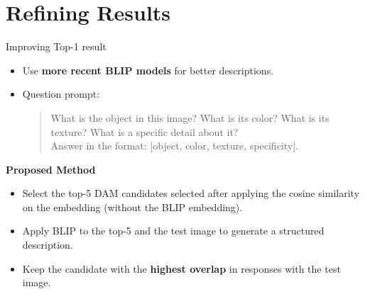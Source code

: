 \documentclass{beamer}
\begin{document}
\section{Refining Results}
\begin{frame}{Improving Top-1 result}
    \begin{itemize}
        \item Use \textbf{more recent BLIP models} for better descriptions.
        \item Question prompt:
            \begin{quote}
                What is the object in this image? What is its color? What is its texture? What is a specific detail about it? \\
                Answer in the format: [object, color, texture, specificity].
            \end{quote}
        \end{itemize}

    \vspace{0.5cm}
    \textbf{Proposed Method}
    \begin{itemize}
        \item Select the top-5 DAM candidates selected after applying the cosine similarity on the embedding (without the BLIP embedding). 
        \item Apply BLIP to the top-5 and the test image to generate a structured description.
        \item Keep the candidate with the \textbf{highest overlap} in responses with the test image.
        \end{itemize}
\end{frame}
\end{document}
